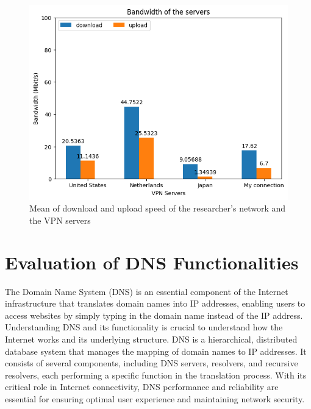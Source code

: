 \documentclass[eng]{class}
\begin{document}
\begin{figure}[H]
  \centering
  \includegraphics[width=.7\columnwidth]{images/ServerBandwidth.png}
  \caption{Mean of download and upload speed of the researcher's network and the VPN servers}
  \label{fig-4}
\end{figure}
\section{Evaluation of DNS Functionalities}
The Domain Name System (DNS) is an essential component of the Internet infrastructure that translates domain names into IP addresses,
enabling users to access websites by simply typing in the domain name instead of the IP address.
Understanding DNS and its functionality is crucial to understand how the Internet works and its underlying structure.
DNS is a hierarchical, distributed database system that manages the mapping of domain names to IP addresses.
It consists of several components, including DNS servers, resolvers, and recursive resolvers, each performing a specific function in the translation process.
With its critical role in Internet connectivity, DNS performance and reliability are essential for ensuring optimal user experience and maintaining network security.
\end{document}
